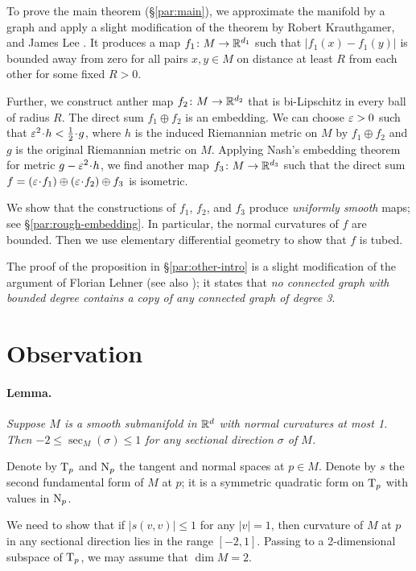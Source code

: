 \documentclass[a4paper,10pt]{article}
\begin{document}
To prove the main theorem (§\ref{par:main}), we approximate the manifold by a graph and apply a slight modification of 
the theorem by Robert Krauthgamer, and James Lee \cite{krauthgamer-lee0,krauthgamer-lee1}.
It produces a map $f_1\colon M\to \mathbb{R}^{d_1}$ such that $|f_1(x)-f_1(y)|$ is bounded away from zero for all pairs $x,y\in M$ on distance at least $R$ from each other for some fixed $R>0$.

Further, we construct anther map $f_2\colon M\to \mathbb{R}^{d_2}$ that is bi-Lipschitz in every ball of radius $R$.
The direct sum $f_1\oplus f_2$ is an embedding.
We can choose $\varepsilon>0$ such that $\eps^2\cdot h<\tfrac12\cdot g$,
where $h$ is the induced Riemannian metric on $M$ by $f_1\oplus f_2$ and $g$ is the original Riemannian metric on $M$.
Applying Nash's embedding theorem for metric $g-\eps^2\cdot h$,
we find another map $f_3\colon M\to \mathbb{R}^{d_3}$ such that the direct sum $f=(\eps\cdot f_1)\oplus (\eps\cdot  f_2)\oplus f_3$ is isometric.

We show that the constructions of $f_1$, $f_2$, and $f_3$ produce \textit{uniformly smooth} maps; see  §\ref{par:rough-embedding}.
In particular, the normal curvatures of $f$ are bounded.
Then we use elementary differential geometry to show that $f$ is tubed. 

The proof of the proposition in §\ref{par:other-intro} is a slight modification of the argument of Florian Lehner \cite[1.2]{lehner} (see also \cite{462670}); it states that \textit{no connected graph with bounded degree contains a copy of any connected graph of degree 3}.

\section*{Observation}

\paragraph{Lemma.}\label{lem:gauss}
\textit{Suppose $M$ is a smooth submanifold in $\mathbb{R}^d$ with normal curvatures at most 1.
Then $-2\le \sec_M(\sigma)\le 1$ for any sectional direction $\sigma$ of $M$.}
\medskip

Denote by $\mathrm{T}_p$ and $\mathrm{N}_p$ the tangent and normal spaces at $p\in M$.
Denote by $s$ the second fundamental form of $M$ at $p$;
it is a symmetric quadratic form on $\mathrm{T}_p$ with values in $\mathrm{N}_p$.

We need to show that if $|s(v,v)|\le 1$ for any $|v|=1$, then curvature of $M$ at $p$ in any sectional direction
lies in the range $[-2,1]$.
Passing to a 2-dimensional subspace of $\mathrm{T}_p$, we may assume that $\dim M=2$.
\end{document}
